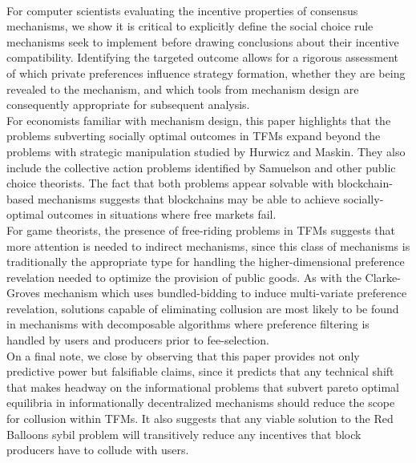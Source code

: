 \documentclass[11pt,a4paper]{llncs}
\begin{document}
\vspace{0.2cm} \\
For computer scientists evaluating the incentive properties of consensus mechanisms, we show it is critical to explicitly define the social choice rule mechanisms seek to implement before drawing conclusions about their incentive compatibility. Identifying the targeted outcome allows for a rigorous assessment of which private preferences influence strategy formation, whether they are being revealed to the mechanism, and which tools from mechanism design are consequently appropriate for subsequent analysis.
\vspace{0.2cm} \\
For economists familiar with mechanism design, this paper highlights that the problems subverting socially optimal outcomes in TFMs expand beyond the problems with strategic manipulation studied by Hurwicz and Maskin. They also include the collective action problems identified by Samuelson and other public choice theorists. The fact that both problems appear solvable with blockchain-based mechanisms suggests that blockchains may be able to achieve socially-optimal outcomes in situations where free markets fail.
\vspace{0.2cm} \\
For game theorists, the presence of free-riding problems in TFMs suggests that more attention is needed to indirect mechanisms, since this class of mechanisms is traditionally the appropriate type for handling the higher-dimensional preference revelation needed to optimize the provision of public goods. As with the Clarke-Groves mechanism which uses bundled-bidding to induce multi-variate preference revelation, solutions capable of eliminating collusion are most likely to be found in mechanisms with decomposable algorithms where preference filtering is handled by users and producers prior to fee-selection.
\vspace{0.2cm} \\
On a final note, we close by observing that this paper provides not only predictive power but falsifiable claims, since it predicts that any technical shift that makes headway on the informational problems that subvert pareto optimal equilibria in informationally decentralized mechanisms should reduce the scope for collusion within TFMs. It also suggests that any viable solution to the Red Balloons sybil problem will transitively reduce any incentives that block producers have to collude with users.
\end{document}
